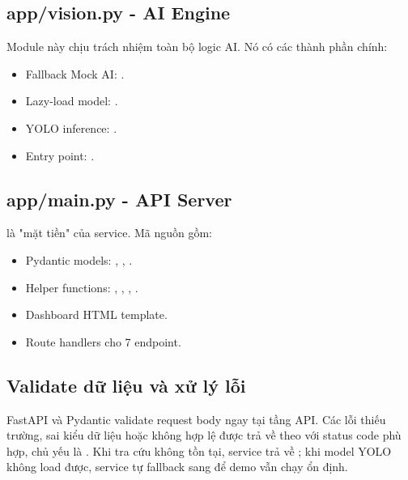 \subsection{app/vision.py - AI Engine}

Module này chịu trách nhiệm toàn bộ logic AI. Nó có các thành phần chính:

\begin{itemize}
    \item Fallback Mock AI: .
    \item Lazy-load model: .
    \item YOLO inference: .
    \item Entry point: .
\end{itemize}

\subsection{app/main.py - API Server}

 là "mặt tiền" của service. Mã nguồn gồm:

\begin{itemize}
    \item Pydantic models:
    \newline {}, 
    \newline {}, .
    \item Helper functions:
    \newline {}, 
    \newline {}, 
    \newline {}, .
    \item Dashboard HTML template.
    \item Route handlers cho 7 endpoint.
\end{itemize}

\subsection{Validate dữ liệu và xử lý lỗi}

FastAPI và Pydantic validate request body ngay tại tầng API. Các lỗi thiếu trường, sai kiểu dữ liệu hoặc  không hợp lệ được trả về theo  với status code phù hợp, chủ yếu là . Khi tra cứu  không tồn tại, service trả về ; khi model YOLO không load được, service tự fallback sang  để demo vẫn chạy ổn định.


